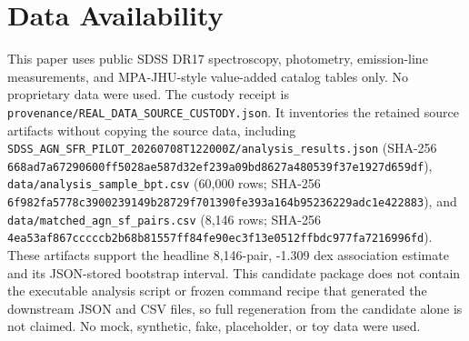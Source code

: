 \documentclass[twocolumn]{aastex631}
\begin{document}
\section*{Data Availability}
This paper uses public SDSS DR17 spectroscopy, photometry, emission-line measurements, and MPA-JHU-style value-added catalog tables only. No proprietary data were used. The custody receipt is \texttt{provenance/REAL\_DATA\_SOURCE\_CUSTODY.json}. It inventories the retained source artifacts without copying the source data, including \texttt{SDSS\_AGN\_SFR\_PILOT\_20260708T122000Z/analysis\_results.json} (SHA-256 \texttt{668ad7a67290600ff5028ae587d32ef239a09bd8627a480539f37e1927d659df}), \texttt{data/analysis\_sample\_bpt.csv} (60,000 rows; SHA-256 \texttt{6f982fa5778c3900239149b28729f701390fe393a164b95236229adc1e422883}), and \texttt{data/matched\_agn\_sf\_pairs.csv} (8,146 rows; SHA-256 \texttt{4ea53af867cccccb2b68b81557ff84fe90ec3f13e0512ffbdc977fa7216996fd}). These artifacts support the headline 8,146-pair, -1.309 dex association estimate and its JSON-stored bootstrap interval. This candidate package does not contain the executable analysis script or frozen command recipe that generated the downstream JSON and CSV files, so full regeneration from the candidate alone is not claimed. No mock, synthetic, fake, placeholder, or toy data were used.

\end{document}
